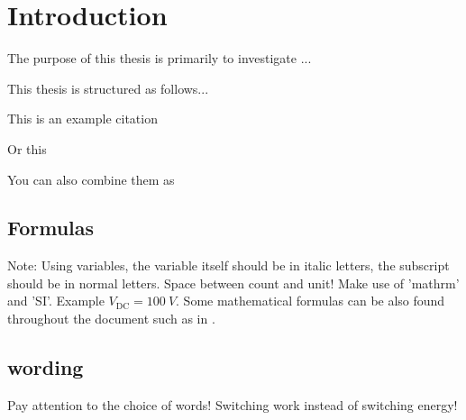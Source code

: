 \chapter{Introduction}
\label{cha:introduction}

The purpose of this thesis is primarily to investigate ...


This thesis is structured as follows...

This is an example citation \cite{WaBo2016}

Or this \cite{wallscheid2014real}

You can also combine them as \cite{WaBo2016,wallscheid2014real}

\section{Formulas}
Note: Using variables, the variable itself should be in italic letters, the subscript should be in normal letters. Space between count and unit! Make use of 'mathrm' and 'SI'. Example $V_\mathrm{DC} = \SI{100}{V}$. Some mathematical formulas can be also found throughout the document such as in .
\section{wording}
Pay attention to the choice of words!
Switching work instead of switching energy!


